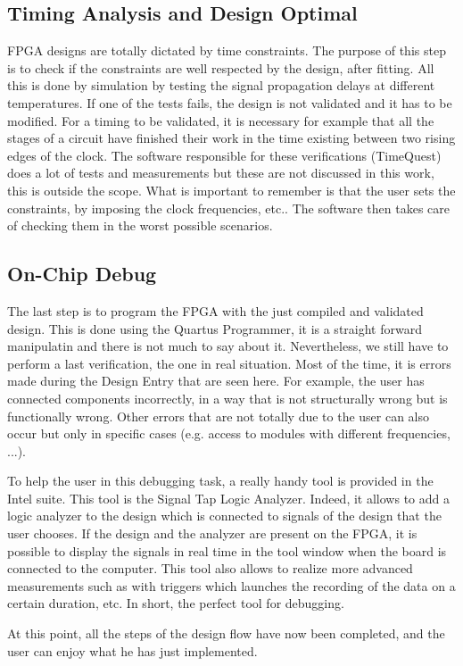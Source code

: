 \subsection{Timing Analysis and Design Optimal}

FPGA designs are totally dictated by time constraints. The purpose of this step is to check if the 
constraints are well respected by the design, after fitting. All this is done by simulation by 
testing the signal propagation delays at different temperatures. If one of the tests fails, the 
design is not validated and it has to be modified. For a timing to be validated, it is 
necessary for example that all the stages of a circuit have finished their work in the time existing 
between two rising edges of the clock. The software responsible for these verifications (TimeQuest) 
does a lot of tests and measurements but these are not discussed in this work, this is outside the 
scope. What is important to remember is that the user sets the constraints, by imposing the clock 
frequencies, etc.. The software then takes care of checking them in the worst possible 
scenarios. 

\subsection{On-Chip Debug}

The last step is to program the FPGA with the just compiled and validated design. This is done
using the Quartus Programmer, it is a straight forward manipulatin and there is not much to say
about it. Nevertheless, we still have to perform a last verification, the one in real situation. 
Most of the time, it is errors made during the Design Entry that are seen here. For 
example, the user has connected components incorrectly, in a way that is not structurally 
wrong but is functionally wrong. Other errors that are not totally due to the user can also occur 
but only in specific cases (e.g. access to modules with different frequencies, ...).

To help the user in this debugging task, a really handy tool is provided in the Intel suite. This 
tool is the Signal Tap Logic Analyzer. Indeed, it allows to add a logic analyzer to the design 
which is connected to signals of the design that the user chooses. If the design and the 
analyzer are present on the FPGA, it is possible to display the signals in real time in the tool 
window when the board is connected to the computer. This tool also allows to realize more advanced 
measurements such as with triggers which launches the recording of the data on a certain 
duration, etc. In short, the perfect tool for debugging.

At this point, all the steps of the design flow have now been completed, and the user can enjoy what 
he has just implemented.